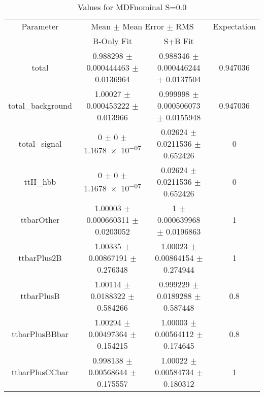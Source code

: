 \begin{table}
\centering
\caption{Values for MDFnominal S=0.0}
\begin{tabular}{cccc}
\toprule
Parameter & \multicolumn{2}{c}{Mean $\pm$ Mean Error $\pm$ RMS} & Expectation\\
 & B-Only Fit & S+B Fit & \\
\midrule
total & \num{0.988298} $\pm$ \num{0.000444463} $\pm$ \num{0.0136964} & \num{0.988346} $\pm$ \num{0.000446244} $\pm$ \num{0.0137504} & \num{0.947036}\\
total\_background & \num{1.00027} $\pm$ \num{0.000453222} $\pm$ \num{0.013966} & \num{0.999998} $\pm$ \num{0.000506073} $\pm$ \num{0.0155948} & \num{0.947036}\\
total\_signal & \num{0} $\pm$ \num{0} $\pm$ \num{1.1678e-07} & \num{0.02624} $\pm$ \num{0.0211536} $\pm$ \num{0.652426} & \num{0}\\
ttH\_hbb & \num{0} $\pm$ \num{0} $\pm$ \num{1.1678e-07} & \num{0.02624} $\pm$ \num{0.0211536} $\pm$ \num{0.652426} & \num{0}\\
ttbarOther & \num{1.00003} $\pm$ \num{0.000660311} $\pm$ \num{0.0203052} & \num{1} $\pm$ \num{0.000639968} $\pm$ \num{0.0196863} & \num{1}\\
ttbarPlus2B & \num{1.00335} $\pm$ \num{0.00867191} $\pm$ \num{0.276348} & \num{1.00023} $\pm$ \num{0.00864154} $\pm$ \num{0.274944} & \num{1}\\
ttbarPlusB & \num{1.00114} $\pm$ \num{0.0188322} $\pm$ \num{0.584266} & \num{0.999229} $\pm$ \num{0.0189288} $\pm$ \num{0.587448} & \num{0.8}\\
ttbarPlusBBbar & \num{1.00294} $\pm$ \num{0.00497364} $\pm$ \num{0.154215} & \num{1.00003} $\pm$ \num{0.00564112} $\pm$ \num{0.174645} & \num{0.8}\\
ttbarPlusCCbar & \num{0.998138} $\pm$ \num{0.00568644} $\pm$ \num{0.175557} & \num{1.00022} $\pm$ \num{0.00584734} $\pm$ \num{0.180312} & \num{1}\\
\bottomrule
\end{tabular}
\end{table}